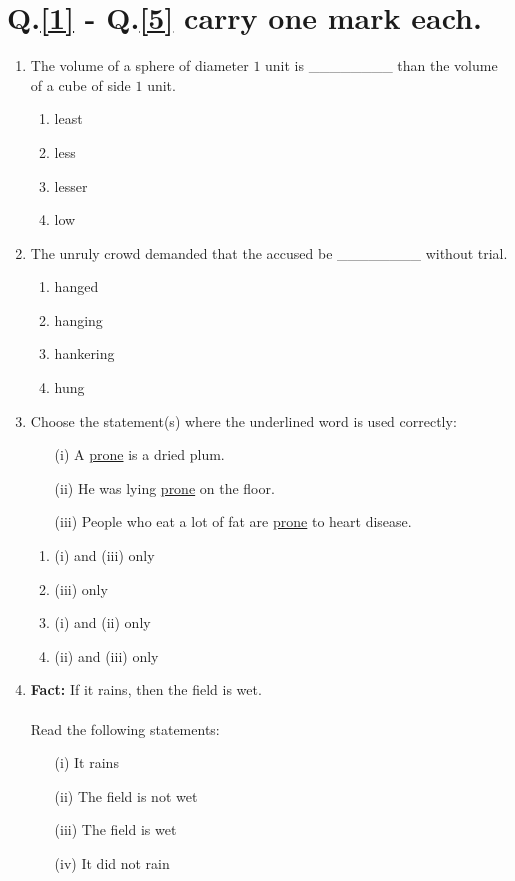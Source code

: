 \documentclass[journal]{IEEEtran}
\begin{document}
\section*{Q.\ref{1} - Q.\ref{5} carry one mark each.}
\begin{enumerate}
    \item \label{1} The volume of a sphere of diameter $1$ unit is \_\_\_\_\_\_\_\_ than the volume of a cube of side $1$ unit.
        \begin{enumerate}
            \item least
            \item less
            \item lesser
            \item low
        \end{enumerate}

    \item The unruly crowd demanded that the accused be \_\_\_\_\_\_\_\_ without trial.
        \begin{enumerate}
            \item hanged
            \item hanging
            \item hankering
            \item hung
        \end{enumerate}

    \item Choose the statement(s) where the underlined word is used correctly:
        \begin{itemize}
            \item[(i)] A \underline{prone} is a dried plum.
            \item[(ii)] He was lying \underline{prone} on the floor.
            \item[(iii)] People who eat a lot of fat are \underline{prone} to heart disease.
        \end{itemize}
        \begin{enumerate}
            \item (i) and (iii) only
            \item (iii) only
            \item (i) and (ii) only
            \item (ii) and (iii) only
        \end{enumerate}

    \item \textbf{Fact:} If it rains, then the field is wet. \\ \\ Read the following statements:
        \begin{itemize}
            \item[(i)] It rains
            \item[(ii)] The field is not wet
            \item[(iii)] The field is wet
            \item[(iv)] It did not rain
        \end{itemize}


\end{enumerate}
\end{document}
